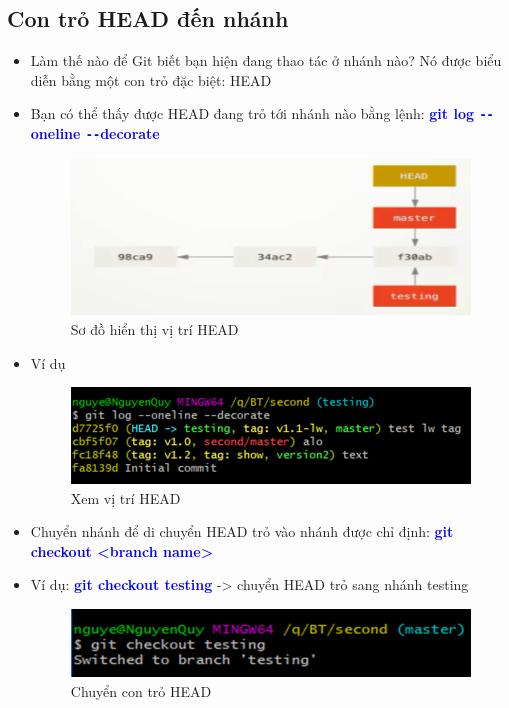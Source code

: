 \documentclass[12pt,a4paper]{report}
\begin{document}
\subsection{Con trỏ HEAD đến nhánh}
\begin{itemize}
\item Làm thế nào để Git biết bạn hiện đang thao tác ở nhánh nào? Nó được biểu diễn bằng một con trỏ đặc biệt: HEAD
\item Bạn có thể thấy được HEAD đang trỏ tới nhánh nào bằng lệnh: \textcolor{blue}{\bf git log \texttt{-{}-}oneline \texttt{-{}-}decorate}

\begin{figure}[!ht]
	\centering
	\includegraphics[width=0.8\linewidth]{screenshot052}
	\caption{Sơ đồ hiển thị vị trí HEAD}
	\label{fig:screenshot052}
	\end{figure}

\item Ví dụ

\begin{figure}[!ht]
	\centering
	\includegraphics[width=0.8\linewidth]{screenshot053}
	\caption{Xem vị trí HEAD}
	\label{fig:screenshot053}
	\end{figure}

\item Chuyển nhánh để di chuyển HEAD trỏ vào nhánh được chỉ định: \textcolor{blue}{\bf git checkout <branch name>} 
\item Ví dụ: \textcolor{blue}{\bf git checkout testing} -> chuyển HEAD trỏ sang nhánh testing

\begin{figure}[!ht]
	\centering
	\includegraphics[width=0.8\linewidth]{screenshot054}
\caption{Chuyển con trỏ HEAD}
	\label{fig:screenshot054}
\end{figure}

\end{itemize}
\end{document}
